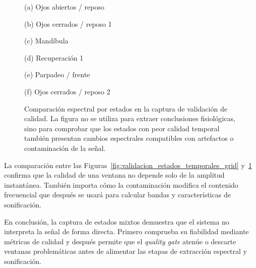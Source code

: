 \begin{figure}[!htbp]
    \centering
    \begin{minipage}{0.48\textwidth}
        \centering
        \small (a) Ojos abiertos / reposo
    \end{minipage}
    \hfill
    \begin{minipage}{0.48\textwidth}
        \centering
        \small (b) Ojos cerrados / reposo 1
    \end{minipage}

    \vspace{0.25cm}

    \begin{minipage}{0.48\textwidth}
        \centering
        \small (c) Mandíbula
    \end{minipage}
    \hfill
    \begin{minipage}{0.48\textwidth}
        \centering
        \small (d) Recuperación 1
    \end{minipage}

    \vspace{0.25cm}

    \begin{minipage}{0.48\textwidth}
        \centering
        \small (e) Parpadeo / frente
    \end{minipage}
    \hfill
    \begin{minipage}{0.48\textwidth}
        \centering
        \small (f) Ojos cerrados / reposo 2
    \end{minipage}
    \caption{Comparación espectral por estados en la captura de validación de calidad. La figura no se utiliza para extraer conclusiones fisiológicas, sino para comprobar que los estados con peor calidad temporal también presentan cambios espectrales compatibles con artefactos o contaminación de la señal.}
    \label{fig:validacion_estados_psd_grid}
\end{figure}

La comparación entre las Figuras~\ref{fig:validacion_estados_temporales_grid} y~\ref{fig:validacion_estados_psd_grid} confirma que la calidad de una ventana no depende solo de la amplitud instantánea. También importa cómo la contaminación modifica el contenido frecuencial que después se usará para calcular bandas y características de sonificación.

En conclusión, la captura de estados mixtos demuestra que el sistema no interpreta la señal de forma directa. Primero comprueba su fiabilidad mediante métricas de calidad y después permite que el \textit{quality gate} atenúe o descarte ventanas problemáticas antes de alimentar las etapas de extracción espectral y sonificación.
